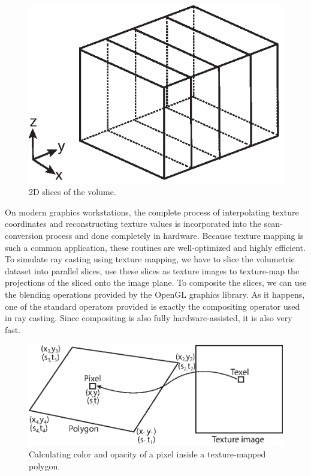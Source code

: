 \begin{figure}[th]
\centering
\includegraphics{Figures/2D_slices}
\decoRule
\caption[2D Sclices]{2D slices of the volume.}
\label{fig:2dslices}
\end{figure}
On modern graphics workstations, the complete process of interpolating texture coordinates and reconstructing texture values is incorporated into the scan-conversion process and done completely in hardware. Because texture mapping is such a common application, these routines are well-optimized and highly efficient.
To simulate ray casting using texture mapping, we have to slice the volumetric dataset into parallel slices, use these slices as texture images to texture-map the projections of the sliced onto the image plane. To composite the slices, we can use the blending operations provided by the OpenGL graphics library. As it happens, one of the standard operators provided is exactly the compositing operator used in ray casting. Since compositing is also fully hardware-assisted, it is also very fast.
\begin{figure}[th]
\centering
\includegraphics{Figures/2dtexmapping}
\decoRule
\caption[2D texture mapping]{Calculating color and opacity of a pixel inside a texture-mapped polygon.}
\label{fig:2dtexture}
\end{figure}

